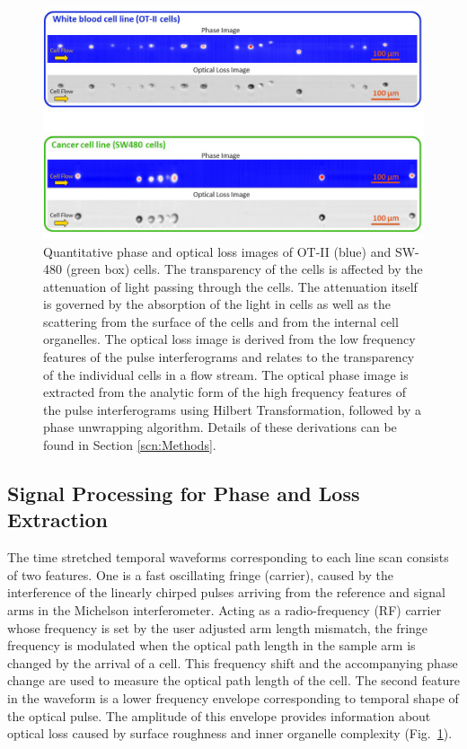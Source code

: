 \documentclass[aps,pra,reprint,superscriptaddress]{revtex4-1}
\begin{document}
\begin{figure}
\includegraphics[scale=0.5]{Figure2DImage.jpg}
\caption{\label{fig:2DImage} Quantitative phase and optical loss images of OT-II (blue) and SW-480 (green box) cells. The transparency of the cells is affected by the attenuation of light passing through the cells. The attenuation itself is governed by the absorption of the light in cells as well as the scattering from the surface of the cells and from the internal cell organelles. The optical loss image is derived from the low frequency features of the pulse interferograms and relates to the transparency of the individual cells in a flow stream. The optical phase image is extracted from the analytic form of the high frequency features of the pulse interferograms using Hilbert Transformation, followed by a phase unwrapping algorithm. Details of these derivations can be found in Section \ref{scn:Methods}.}
\end{figure}

\subsection{Signal Processing for Phase and Loss Extraction}

The time stretched temporal waveforms corresponding to each line scan consists of two features. One is a fast oscillating fringe (carrier), caused by the interference of the linearly chirped pulses arriving from the reference and signal arms in the Michelson interferometer. Acting as a radio-frequency (RF) carrier whose frequency is set by the user adjusted arm length mismatch, the fringe frequency is modulated when the optical path length in the sample arm is changed by the arrival of a cell. This frequency shift and the accompanying phase change are used to measure the optical path length of the cell. The second feature in the waveform is a lower frequency envelope corresponding to temporal shape of the optical pulse. The amplitude of this envelope provides information about optical loss caused by surface roughness and inner organelle complexity (Fig.~\ref{fig:2DImage}). 
\end{document}

